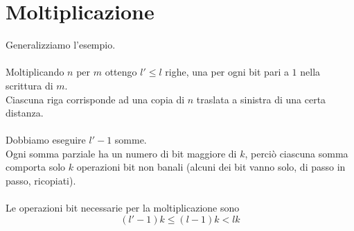 \documentclass[a4paper,12pt, oneside]{book}
\begin{document}
	\section{Moltiplicazione}
		Generalizziamo l'esempio.\\\\
		Moltiplicando $n$ per $m$ ottengo $l' \leq l$ righe, una per ogni bit pari a $1$ nella scrittura di $m$.\\ Ciascuna riga corrisponde ad una copia di $n$ traslata a sinistra di una certa distanza.\\\\
		Dobbiamo eseguire $l'-1$ somme.\\ Ogni somma parziale ha un numero di bit maggiore di $k$, perciò ciascuna somma comporta solo $k$ operazioni bit non banali (alcuni dei bit vanno solo, di passo in passo, ricopiati).\\\\
		Le operazioni bit necessarie per la moltiplicazione sono $$(l'-1)k \leq (l-1)k < lk$$
		
\end{document}
